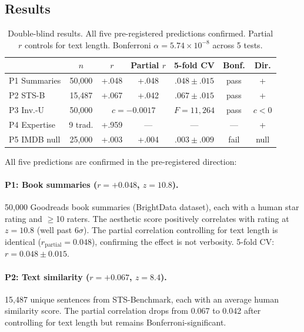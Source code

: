 \documentclass[journal]{IEEEtran}
\theoremstyle{definition}
\theoremstyle{remark}
\begin{document}
\subsection{Results}

\begin{table}[h]
\centering
\caption{Double-blind results. All five pre-registered predictions
confirmed.  Partial $r$ controls for text length.  Bonferroni
$\alpha = 5.74 \times 10^{-8}$ across 5 tests.}
\label{tab:results}
\footnotesize
\begin{tabular}{lcccccc}
\toprule
& $n$ & $r$ & Partial $r$ & 5-fold CV & Bonf. & Dir. \\
\midrule
P1 Summaries & 50{,}000 & +.048 & +.048 & $.048 \pm .015$ & pass & + \\
P2 STS-B     & 15{,}487 & +.067 & +.042 & $.067 \pm .015$ & pass & + \\
P3 Inv.-U    & 50{,}000 & \multicolumn{2}{c}{$c = -0.0017$} & $F\!=\!11{,}264$ & pass & $c\!<\!0$ \\
P4 Expertise & 9 trad.  & +.959 & --- & --- & --- & + \\
P5 IMDB null & 25{,}000 & +.003 & +.004 & $.003 \pm .009$ & fail & null \\
\bottomrule
\end{tabular}
\end{table}

All five predictions are confirmed in the pre-registered direction:

\paragraph{P1: Book summaries ($r = +0.048$, $z = 10.8$).}
50{,}000 Goodreads book summaries (BrightData dataset), each with
a human star rating and $\geq$10 raters.  The aesthetic score
positively correlates with rating at $z = 10.8$ (well past $6\sigma$).
The partial correlation controlling for text length is identical
($r_{\mathrm{partial}} = 0.048$), confirming the effect is not
verbosity.  5-fold CV: $r = 0.048 \pm 0.015$.

\paragraph{P2: Text similarity ($r = +0.067$, $z = 8.4$).}
15{,}487 unique sentences from STS-Benchmark, each with an average
human similarity score.  The partial correlation drops from 0.067
to 0.042 after controlling for text length but remains Bonferroni-significant.
\end{document}
